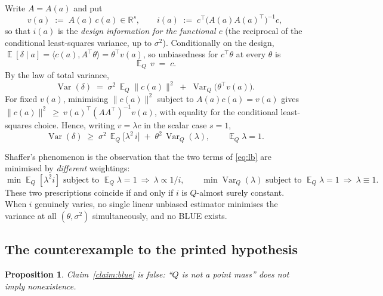 \documentclass[11pt]{article}
\theoremstyle{plain}
\newtheorem{proposition}[theorem]{Proposition}
\theoremstyle{definition}
\theoremstyle{remark}
\DeclareMathOperator{\Var}{Var}
\DeclareMathOperator{\E}{\mathbb{E}}
\newcommand{\R}{\mathbb{R}}
\begin{document}
Write $A=A(a)$ and put
\[
  v(a) \;:=\; A(a)\,c(a) \in \R^{s},
  \qquad
  i(a) \;:=\; c^{\!\top}\bigl(A(a)A(a)^{\!\top}\bigr)^{-1}c ,
\]
so that $i(a)$ is the \emph{design information for the functional $c$} (the reciprocal of
the conditional least-squares variance, up to $\sigma^2$). Conditionally on the design,
$\E[\delta\mid a]=\langle c(a), A^{\!\top}\theta\rangle = \theta^{\!\top}v(a)$, so
unbiasedness for $c^{\!\top}\theta$ at every $\theta$ is
\begin{equation}\label{eq:unb}
  \E_Q\,v \;=\; c .
\end{equation}
By the law of total variance,
\begin{equation}\label{eq:ltv}
  \Var(\delta)
  \;=\; \sigma^{2}\,\E_Q\bigl\|c(a)\bigr\|^{2}
      \;+\; \Var_Q\bigl(\theta^{\!\top}v(a)\bigr) .
\end{equation}
For fixed $v(a)$, minimising $\|c(a)\|^{2}$ subject to $A(a)c(a)=v(a)$ gives
$\|c(a)\|^{2}\ \ge\ v(a)^{\!\top}(AA^{\!\top})^{-1}v(a)$, with equality for the conditional
least-squares choice. Hence, writing $v=\lambda c$ in the scalar case $s=1$,
\begin{equation}\label{eq:lb}
  \Var(\delta)
  \;\ge\; \sigma^{2}\,\E_Q\bigl[\lambda^{2}\, i\bigr]
      \;+\; \theta^{2}\,\Var_Q(\lambda),
  \qquad \E_Q\lambda = 1 .
\end{equation}

Shaffer's phenomenon is the observation that the two terms of \eqref{eq:lb} are minimised by
\emph{different} weightings:
\[
  \min \E_Q[\lambda^{2} i] \text{ subject to } \E_Q\lambda=1
  \ \Longrightarrow\ \lambda \propto 1/i,
  \qquad
  \min \Var_Q(\lambda) \text{ subject to } \E_Q\lambda=1
  \ \Longrightarrow\ \lambda \equiv 1 .
\]
These two prescriptions coincide if and only if $i$ is $Q$-almost surely constant. When $i$
genuinely varies, no single linear unbiased estimator minimises the variance at all
$(\theta,\sigma^{2})$ simultaneously, and no BLUE exists.

\subsection{The counterexample to the printed hypothesis}

\begin{proposition}\label{prop:blue-false}
Claim~\ref{claim:blue} is false: ``$Q$ is not a point mass'' does not imply nonexistence.
\end{proposition}
\end{document}
